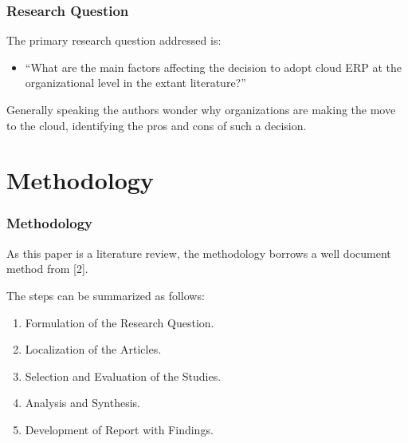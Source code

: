 \documentclass{beamer}
\begin{document}
\begin{frame}

    \frametitle{Research Question}

    The primary research question addressed is:
    \begin{itemize}
        \item[$\ast$] ``What are the main factors affecting the decision to adopt cloud ERP at the organizational level in the extant literature?'' \pause
    \end{itemize}

    \vspace{5mm}
    Generally speaking the authors wonder why organizations are making the move to the cloud, identifying the pros and cons of such a decision.

\end{frame}


\section{Methodology}

\begin{frame}

    \frametitle{Methodology}

    As this paper is a literature review, the methodology borrows a well document method from [2]. \pause

    \vspace{5mm}
    The steps can be summarized as follows:
    \begin{enumerate}
        \item Formulation of the Research Question. \pause
        \item Localization of the Articles. \pause
        \item Selection and Evaluation of the Studies. \pause
        \item Analysis and Synthesis. \pause
        \item Development of Report with Findings.
    \end{enumerate}

\end{frame}
\end{document}
